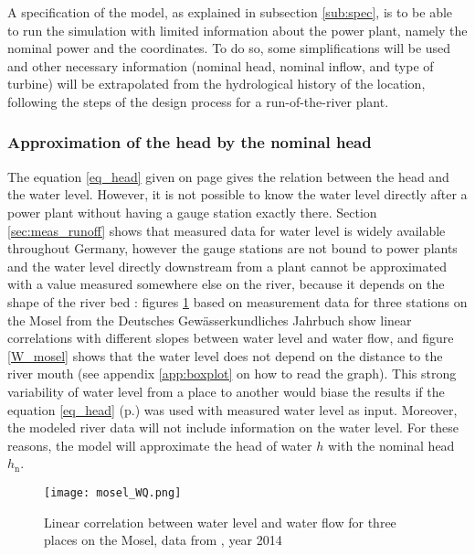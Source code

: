 A specification of the model, as explained in subsection \ref{sub:spec}, is to be able to run the simulation with limited information about the power plant, namely the nominal power and the coordinates. To do so, some simplifications will be used and other necessary information (nominal head, nominal inflow, and type of turbine) will be extrapolated from the hydrological history of the location, following the steps of the design process for a run-of-the-river plant.
\subsubsection{Approximation of the head by the nominal head}
\label{sub:approx_h}

The equation \ref{eq_head} given on page \pageref{eq_head} gives the relation between the head and the water level. However, it is not possible to know the water level directly after a power plant without having a gauge station exactly there. Section \ref{sec:meas_runoff} shows that measured data for water level is widely available throughout Germany, however the gauge stations are not bound to power plants and the water level directly downstream from a plant cannot be approximated with a value measured somewhere else on the river, because it depends on the shape of the river bed : figures \ref{mosel_WQ} based on measurement data for three stations on the Mosel from the Deutsches Gewässerkundliches Jahrbuch show linear correlations with different slopes between water level and water flow, and figure \ref{W_mosel} shows that the water level does not depend on the distance to the river mouth (see appendix \ref{app:boxplot} on how to read the graph). \newline
This strong variability of water level from a place to another would biase the results if the equation \ref{eq_head} (p.\pageref{eq_head}) was used with measured water level as input. Moreover, the modeled river data will not include information on the water level. For these reasons, the model will approximate the head of water $h$ with the nominal head $h_\mathrm{n}$.

\begin{figure}[H]
\centering
\texttt{[image: mosel\_WQ.png]}
\caption[Linear correlation between water level and  water flow for three places on the Mosel]{Linear correlation between water level and water flow for three places on the Mosel, data from \cite{dgj}, year 2014}
\label{mosel_WQ}
\end{figure}


